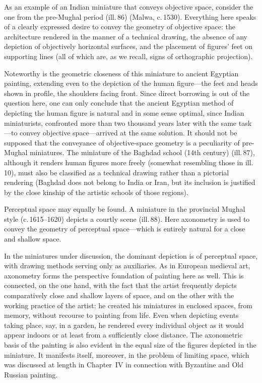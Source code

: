 As an example of an Indian miniature that conveys objective space, consider the one
from the pre-Mughal period (ill.\,86) (Malwa, c.\,1530). Everything here speaks of
a clearly expressed desire to convey the geometry of objective space: the
architecture rendered in the manner of a technical drawing, the absence of any
depiction of objectively horizontal surfaces, and the placement of figures' feet on
supporting lines (all of which are, as we recall, signs of orthographic projection).


Noteworthy is the geometric closeness of this miniature to ancient Egyptian
painting, extending even to the depiction of the human figure---the feet and heads
shown in profile, the shoulders facing front. Since direct borrowing is out of the
question here, one can only conclude that the ancient Egyptian method of depicting
the human figure is natural and in some sense optimal, since Indian miniaturists,
confronted more than two thousand years later with the same task---to convey
objective space---arrived at the same solution. It should not be supposed that the
conveyance of objective-space geometry is a peculiarity of pre-Mughal miniatures.
The miniature of the Baghdad school (14th century) (ill.\,87), although it renders
human figures more freely (somewhat resembling those in ill.\,10), must also be
classified as a technical drawing rather than a pictorial rendering (Baghdad does
not belong to India or Iran, but its inclusion is justified by the close kinship of
the artistic schools of those regions).

Perceptual space may equally be found. A miniature in the provincial Mughal style
(c.\,1615--1620) depicts a courtly scene (ill.\,88). Here axonometry is used to
convey the geometry of perceptual space---which is entirely natural for a close and
shallow space.


In the miniatures under discussion, the dominant depiction is of perceptual space,
with drawing methods serving only as auxiliaries. As in European medieval art,
axonometry forms the perspective foundation of painting here as well. This is
connected, on the one hand, with the fact that the artist frequently depicts
comparatively close and shallow layers of space, and on the other with the working
practice of the artist: he created his miniatures in enclosed spaces, from memory,
without recourse to painting from life. Even when depicting events taking place,
say, in a garden, he rendered every individual object as it would appear indoors or
at least from a sufficiently close distance. The axonometric basis of the painting
is also evident in the equal size of the figures depicted in the miniature. It
manifests itself, moreover, in the problem of limiting space, which was discussed
at length in Chapter~IV in connection with Byzantine and Old Russian painting.

